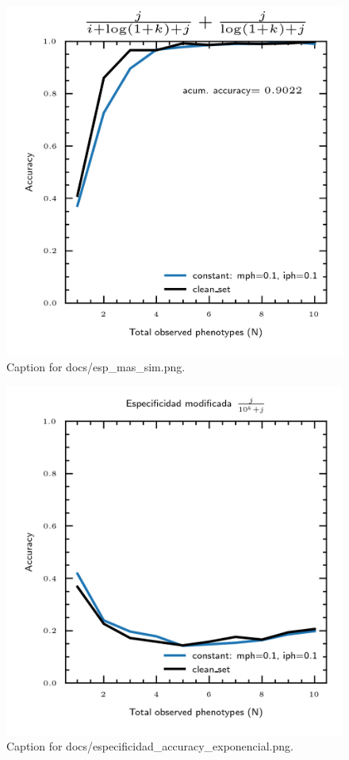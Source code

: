 \documentclass{article}
\begin{document}
\begin{figure}[h] \centering \includegraphics{docs/esp_mas_sim.png} \caption{Caption for docs/esp_mas_sim.png.} \end{figure}
\begin{figure}[h] \centering \includegraphics{docs/especificidad_accuracy_exponencial.png} \caption{Caption for docs/especificidad_accuracy_exponencial.png.} \end{figure}
\end{document}
